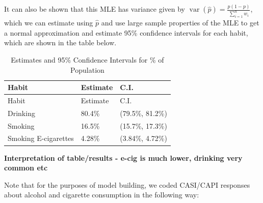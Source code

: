 \documentclass[
  11pt,
]{article}
\begin{document}
It can also be shown that this MLE has variance given by
\(\mathop{\mathrm{var}}(\widehat{p})=\frac{p(1-p)}{\sum_{i=1}^{n}w_i}\),
which we can estimate using \(\widehat{p}\) and use large sample
properties of the MLE to get a normal approximation and estimate 95\%
confidence intervals for each habit, which are shown in the table below.

\begin{longtable}[]{@{}lll@{}}
\caption{Estimates and 95\% Confidence Intervals for \% of
Population}\tabularnewline
\toprule\noalign{}
Habit & Estimate & C.I. \\
\midrule\noalign{}
\endfirsthead
\toprule\noalign{}
Habit & Estimate & C.I. \\
\midrule\noalign{}
\endhead
\bottomrule\noalign{}
\endlastfoot
Drinking & 80.4\% & (79.5\%, 81.2\%) \\
Smoking & 16.5\% & (15.7\%, 17.3\%) \\
Smoking E-cigarettes & 4.28\% & (3.84\%, 4.72\%) \\
\end{longtable}

\textbf{Interpretation of table/results - e-cig is much lower, drinking
very common etc}

Note that for the purposes of model building, we coded CASI/CAPI
responses about alcohol and cigarette consumption in the following way:
\end{document}
